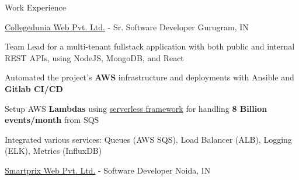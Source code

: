 \documentclass[../resume.tex]{subfiles}
\begin{document}
\begin{rSection}{Work Experience}
\begin{rSubsection}
    {\href{https://go.rohit.page/cd}{Collegedunia Web Pvt. Ltd.}}
    {  -  }
    {Sr. Software Developer}
    {Gurugram, IN}

    \item Team Lead for a multi-tenant fullstack application with both public and internal REST APIs, using NodeJS, MongoDB, and React
    \item Automated the project's \textbf{AWS} infrastructure and deployments with Ansible and \textbf{Gitlab CI/CD}
    \item Setup AWS \textbf{Lambdas} using \href{https://www.serverless.com/}{serverless framework} for handling \textbf{8 Billion events/month} from SQS
    \item Integrated various services: Queues (AWS SQS), Load Balancer (ALB), Logging (ELK), Metrics (InfluxDB)

\end{rSubsection}

\begin{rSubsection}
    {\href{https://go.rohit.page/smpx}{Smartprix Web Pvt. Ltd.}}
    {  -  }
    {Software Developer}
    {Noida, IN}


\end{rSubsection}
\end{rSection}
\end{document}
